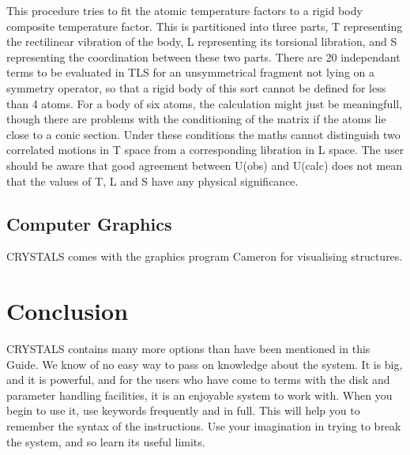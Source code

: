 \documentclass[10pt,a4paper]{report}
\begin{document}
\bigskip{}




This procedure tries to fit the atomic temperature factors to a rigid body
 composite temperature factor. This is partitioned into three parts, T
 representing the rectilinear vibration of the body, L representing its
 torsional libration, and S representing the coordination between these two
 parts. There are 20 independant terms to be evaluated in TLS for an
 unsymmetrical fragment not lying on a symmetry operator, so that a rigid
 body of this sort cannot be defined for less than 4 atoms. For a body
 of six atoms, the calculation might just be meaningfull, though there are
 problems with the conditioning of the matrix if the atoms lie close to a conic
 section. Under these conditions the maths cannot distinguish two correlated
 motions in T space from a corresponding libration in L space. The user
 should be aware that good agreement between U(obs) and U(calc) does not mean
 that the values of T, L and S have any physical significance.
\section{Computer Graphics}


CRYSTALS comes with the graphics program Cameron for visualising structures.
\chapter{Conclusion}


CRYSTALS contains many more options than have been mentioned in this Guide. We know of no easy way to pass on knowledge about the system. It is big, and it is powerful, and for the users who have come to terms with the disk and parameter handling facilities, it is an enjoyable system to work with. When you begin to use it, use keywords frequently and in full. This will help you to remember the syntax of the instructions. Use your imagination in trying to break the system, and so learn its useful limits.



\printindex
\end{document}
